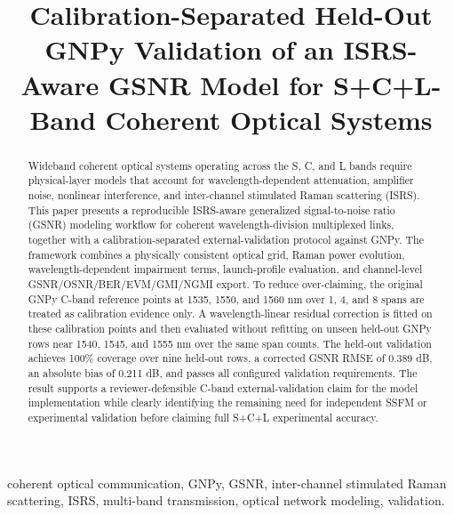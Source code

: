 \documentclass[conference]{IEEEtran}
\begin{document}
\title{Calibration-Separated Held-Out GNPy Validation of an ISRS-Aware GSNR Model for S+C+L-Band Coherent Optical Systems}

\author{%
}

\maketitle

\begin{abstract}
Wideband coherent optical systems operating across the S, C, and L bands require physical-layer models that account for wavelength-dependent attenuation, amplifier noise, nonlinear interference, and inter-channel stimulated Raman scattering (ISRS). This paper presents a reproducible ISRS-aware generalized signal-to-noise ratio (GSNR) modeling workflow for coherent wavelength-division multiplexed links, together with a calibration-separated external-validation protocol against GNPy. The framework combines a physically consistent optical grid, Raman power evolution, wavelength-dependent impairment terms, launch-profile evaluation, and channel-level GSNR/OSNR/BER/EVM/GMI/NGMI export. To reduce over-claiming, the original GNPy C-band reference points at 1535, 1550, and 1560 nm over 1, 4, and 8 spans are treated as calibration evidence only. A wavelength-linear residual correction is fitted on these calibration points and then evaluated without refitting on unseen held-out GNPy rows near 1540, 1545, and 1555 nm over the same span counts. The held-out validation achieves 100\% coverage over nine held-out rows, a corrected GSNR RMSE of 0.389 dB, an absolute bias of 0.211 dB, and passes all configured validation requirements. The result supports a reviewer-defensible C-band external-validation claim for the model implementation while clearly identifying the remaining need for independent SSFM or experimental validation before claiming full S+C+L experimental accuracy.
\end{abstract}

\begin{IEEEkeywords}
coherent optical communication, GNPy, GSNR, inter-channel stimulated Raman scattering, ISRS, multi-band transmission, optical network modeling, validation.
\end{IEEEkeywords}
\end{document}
